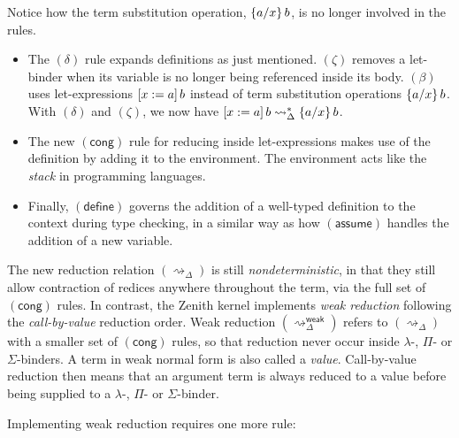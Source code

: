 \documentclass[twoside]{report}
\begin{document}
Notice how the term substitution operation, $\subst x a b$, is no longer involved in the rules.

\begin{itemize}
    \item The $(\delta)$ rule expands definitions as just mentioned. $(\zeta)$ removes a let-binder when its variable is no longer being referenced inside its body. $(\beta)$ uses let-expressions $\llet x a b$ instead of term substitution operations $\subst x a b$. With $(\delta)$ and $(\zeta)$, we now have $\llet x a b \rightsquigarrow_\Delta^\ast \subst x a b$.

    \item The new $(\mathsf{cong})$ rule for reducing inside let-expressions makes use of the definition by adding it to the environment. The environment acts like the \emph{stack} in programming languages.

    \item Finally, $(\mathsf{define})$ governs the addition of a well-typed definition to the context during type checking, in a similar way as how $(\mathsf{assume})$ handles the addition of a new variable.
\end{itemize}

The new reduction relation $(\rightsquigarrow_\Delta)$ is still \emph{nondeterministic}, in that they still allow contraction of redices anywhere throughout the term, via the full set of $(\mathsf{cong})$ rules. In contrast, the Zenith kernel implements \emph{weak reduction} following the \emph{call-by-value} reduction order. Weak reduction $(\rightsquigarrow^\mathsf{weak}_\Delta)$ refers to $(\rightsquigarrow_\Delta)$ with a smaller set of $(\mathsf{cong})$ rules, so that reduction never occur inside $\lambda$-, $\Pi$- or $\Sigma$-binders. A term in weak normal form is also called a \emph{value}. Call-by-value reduction then means that an argument term is always reduced to a value before being supplied to a $\lambda$-, $\Pi$- or $\Sigma$-binder.

Implementing weak reduction requires one more rule:
\begin{prooftree}
\end{prooftree}
\end{document}
